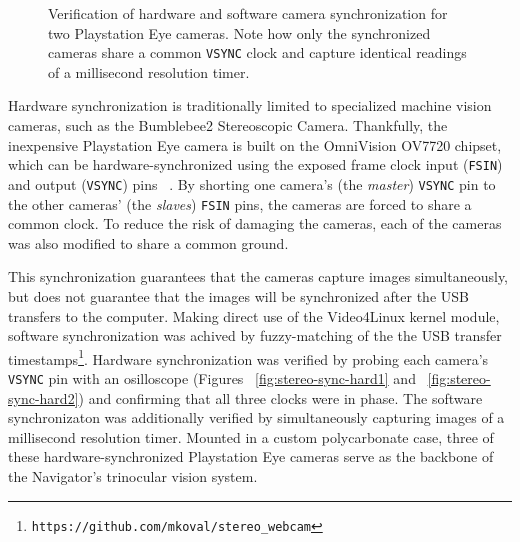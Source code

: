 \documentclass[11pt,twocolumn]{article}
\begin{document}
\begin{figure*}
	\centering
	\caption{
		Verification of hardware and software camera synchronization for two
		Playstation Eye cameras. Note how only the synchronized cameras share a
		common \texttt{VSYNC} clock and capture identical readings of a
		millisecond resolution timer.
	}
	\label{fig:stereo-sync}
\end{figure*}

Hardware synchronization is traditionally limited to specialized machine vision
cameras, such as the Bumblebee2 Stereoscopic Camera. Thankfully, the
inexpensive Playstation Eye camera is built on the OmniVision OV7720 chipset,
which can be hardware-synchronized using the exposed frame clock input
(\texttt{FSIN}) and output (\texttt{VSYNC}) pins ~\cite{omnivision}. By shorting
one camera's (the \textit{master}) \texttt{VSYNC} pin to the other cameras'
(the \textit{slaves}) \texttt{FSIN} pins, the cameras are forced to share a
common clock. To reduce the risk of damaging the cameras, each of the cameras
was also modified to share a common ground.

This synchronization guarantees that the cameras capture images simultaneously,
but does not guarantee that the images will be synchronized after the USB
transfers to the computer. Making direct use of the Video4Linux kernel module,
software synchronization was achived by fuzzy-matching of the the USB transfer
timestamps\footnote{\texttt{https://github.com/mkoval/stereo\_webcam}}.
Hardware synchronization was verified by probing each camera's \texttt{VSYNC}
pin with an osilloscope (Figures ~\ref{fig:stereo-sync-hard1} and
~\ref{fig:stereo-sync-hard2}) and confirming that all three clocks were in
phase. The software synchronizaton was additionally verified by simultaneously
capturing images of a millisecond resolution timer. Mounted in a custom
polycarbonate case, three of these hardware-synchronized Playstation Eye
cameras serve as the backbone of the Navigator's trinocular vision system.
\end{document}
